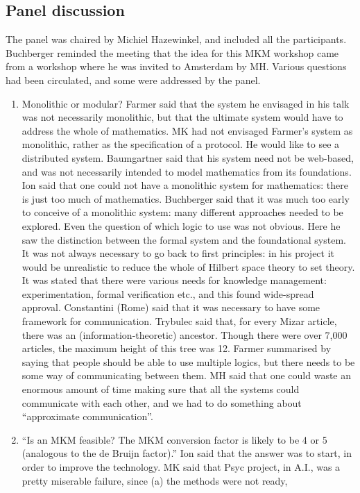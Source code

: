 \documentclass[11pt, a4paper]{article}
\begin{document}
\subsection{Panel discussion}
The panel was chaired by Michiel Hazewinkel, and included all the
participants. Buchberger reminded the meeting that the idea for this MKM
workshop came from a workshop where he was invited to Amsterdam by MH.
Various questions had been circulated, and some were addressed by the
panel.
\begin{enumerate}
\item Monolithic or modular? Farmer said that the system he envisaged in
his talk was not necessarily monolithic, but that the ultimate system would
have to address the whole of mathematics. MK had not envisaged Farmer's
system as monolithic, rather as the specification of a protocol. He would
like to see a distributed system. Baumgartner said that his system need not
be web-based, and was not necessarily intended to model mathematics from
its foundations. Ion said that one could not have a monolithic system for
mathematics: there is just too much of mathematics. Buchberger said that it
was much too early to conceive of a monolithic system: many different
approaches needed to be explored. Even the question of which logic to use
was not obvious. Here he saw the distinction between the formal system and
the foundational system. It was not always necessary to go back to first
principles: in his project it would be unrealistic to reduce the whole of
Hilbert space theory to set theory. It was stated that there were various
needs for knowledge management: experimentation, formal verification etc.,
and this found wide-spread approval. Constantini (Rome) said that it was
necessary to have some framework for communication. Trybulec said that,
for every Mizar article, there was an (information-theoretic) ancestor.
Though there were over 7,000 articles, the maximum height of this tree was
12. Farmer summarised by saying that people should be able to use multiple
logics, but there needs to be some way of communicating between them. MH
said that one could waste an enormous amount of time making sure that all
the systems could communicate with each other, and we had to do something
about ``approximate communication''.
\item ``Is an MKM feasible? The MKM conversion factor is likely to be 4 or 5
(analogous to the de Bruijn factor).'' Ion said that the answer was to
start, in order to improve the technology. MK said that Psyc project, in
A.I., was a pretty miserable failure, since (a) the methods were not ready,

\end{enumerate}
\end{document}
